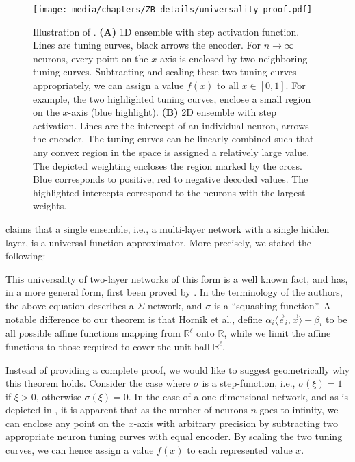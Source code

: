\begin{figure}
	\centering
	\texttt{[image: media/chapters/ZB\_details/universality\_proof.pdf]}%
	{\label{fig:universality_proof_a}}%
	{\label{fig:universality_proof_b}}%
	\caption[Illustration of ]{Illustration of . \textbf{(A)} 1D ensemble with step activation function. Lines are tuning curves, black arrows the encoder. For $n \to \infty$ neurons, every point on the $x$-axis is enclosed by two neighboring tuning-curves. Subtracting and scaling these two tuning curves appropriately, we can assign a value $f(x)$ to all $x \in [0, 1]$.
	For example, the two highlighted tuning curves, enclose a small region on the $x$-axis (blue highlight).
	\textbf{(B)} 2D ensemble with step activation. Lines are the intercept of an individual neuron, arrows the encoder.
	The tuning curves can be linearly combined such that any convex region in the space is assigned a relatively large value.
	The depicted weighting encloses the region marked by the cross. Blue corresponds to positive, red to negative decoded values. The highlighted intercepts correspond to the neurons with the largest weights.}
\end{figure}

 claims that a single \NEF ensemble, i.e., a multi-layer network with a single hidden layer, is a universal function approximator.
More precisely, we stated the following:

\ThmTwoLayerUniversal*

This universality of two-layer networks of this form is a well known fact, and has, in a more general form, first been proved by \citet{hornik1989multilayer}.
In the terminology of the authors, the above equation describes a $\Sigma$-network, and $\sigma$ is a \enquote{squashing function}.
A notable difference to our theorem is that Hornik et al., define $\alpha_i \langle \vec e_i, \vec x \rangle + \beta_i$ to be all possible affine functions mapping from $\mathbb{R}^\ell$ onto $\mathbb{R}$, while we limit the affine functions to those required to cover the unit-ball $\mathbb{B}^\ell$.

Instead of providing a complete proof, we would like to suggest geometrically why this theorem holds.
Consider the case where $\sigma$ is a step-function, i.e., $\sigma(\xi) = 1$ if $\xi > 0$, otherwise $\sigma(\xi) = 0$.
In the case of a one-dimensional network, and as is depicted in , it is apparent that as the number of neurons $n$ goes to infinity, we can enclose any point on the $x$-axis with arbitrary precision by subtracting two appropriate neuron tuning curves with equal encoder.
By scaling the two tuning curves, we can hence assign a value $f(x)$ to each represented value $x$.

